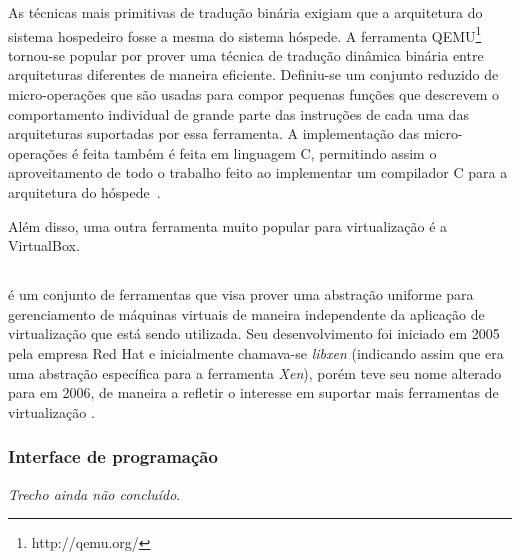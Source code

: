 As técnicas mais primitivas de tradução binária exigiam que a arquitetura
do sistema hospedeiro fosse a mesma do sistema hóspede. A ferramenta
QEMU\footnote{http://qemu.org/} tornou-se popular por prover uma técnica de
tradução dinâmica binária entre arquiteturas diferentes de maneira
eficiente. Definiu-se um conjunto reduzido de micro-operações que
são usadas para compor pequenas funções que descrevem o comportamento
individual de grande parte das instruções de cada uma das arquiteturas
suportadas por essa ferramenta. A implementação das micro-operações é feita
também é feita em linguagem C, permitindo assim o aproveitamento de todo o
trabalho feito ao implementar um compilador C para a arquitetura do
hóspede~\cite{bellard2005qemu}.

Além disso, uma outra ferramenta muito popular para virtualização é a
VirtualBox.




\subsection{\libvirt}\label{sec:libvirt}


\libvirt{} é um conjunto de ferramentas que visa prover uma abstração
uniforme para gerenciamento de máquinas virtuais de maneira independente 
da aplicação de virtualização que está sendo utilizada. Seu desenvolvimento
foi iniciado em 2005 pela empresa Red Hat e inicialmente chamava-se
\emph{libxen} (indicando assim que era uma abstração específica para a
ferramenta \emph{Xen}), porém teve seu nome alterado para \libvirt{} em
2006, de maneira a refletir o interesse em suportar mais ferramentas de
virtualização .

\subsubsection{Interface de programação}\label{sec:libvirtapi}

\emph{Trecho ainda não concluído}.
